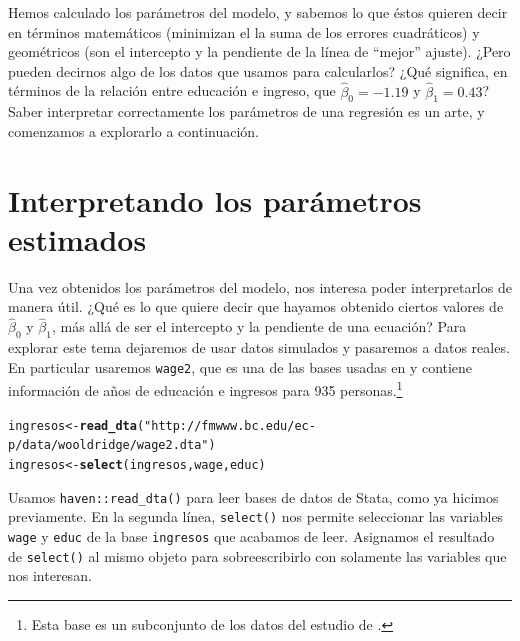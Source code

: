 \documentclass[12pt]{report}\usepackage[]{graphicx}\usepackage[]{color}
\makeatletter
\newcommand{\hlstr}[1]{\textcolor[rgb]{0.192,0.494,0.8}{#1}}%
\newcommand{\hlstd}[1]{\textcolor[rgb]{0.345,0.345,0.345}{#1}}%
\newcommand{\hlkwb}[1]{\textcolor[rgb]{0.69,0.353,0.396}{#1}}%
\newcommand{\hlkwd}[1]{\textcolor[rgb]{0.737,0.353,0.396}{\textbf{#1}}}%
\newenvironment{kframe}{%
 \def\at@end@of@kframe{}%
 \ifinner\ifhmode%
  \def\at@end@of@kframe{\end{minipage}}%
  \begin{minipage}{\columnwidth}%
 \fi\fi%
 \def\FrameCommand##1{\hskip\@totalleftmargin \hskip-\fboxsep
 \colorbox{shadecolor}{##1}\hskip-\fboxsep
     \hskip-\linewidth \hskip-\@totalleftmargin \hskip\columnwidth}%
 \MakeFramed {\advance\hsize-\width
   \@totalleftmargin\z@ \linewidth\hsize
   \@setminipage}}%
 {\par\unskip\endMakeFramed%
 \at@end@of@kframe}
\newenvironment{knitrout}{}{} %
\makeatother
\begin{document}

Hemos calculado los parámetros del modelo, y sabemos lo que éstos quieren decir en términos matemáticos (minimizan el la suma de los errores cuadráticos) y geométricos (son el intercepto y la pendiente de la línea de ``mejor'' ajuste).
¿Pero pueden decirnos algo de los datos que usamos para calcularlos?
¿Qué significa, en términos de la relación entre educación e ingreso, que $\hat \beta_0 = -1.19$ y $\hat \beta_1 = 0.43$?
Saber interpretar correctamente los parámetros de una regresión es un arte, y comenzamos a explorarlo a continuación.


\section{Interpretando los parámetros estimados}

Una vez obtenidos los parámetros del modelo, nos interesa poder interpretarlos de manera útil. ¿Qué es lo que quiere decir que hayamos obtenido ciertos valores de $\hat\beta_0$ y $\hat\beta_1$, más allá de ser el intercepto y la pendiente de una ecuación?
Para explorar este tema dejaremos de usar datos simulados y pasaremos a datos reales.
En particular usaremos \verb|wage2|, que es una de las bases usadas en \textcite{wooldridge_introductory_2016} y contiene información de años de educación e ingresos para 935 personas.\footnote{Esta base es un subconjunto de los datos del estudio de \textcite{blackburn_unobserved_1992}.}

\begin{knitrout}
\color{fgcolor}\begin{kframe}
\begin{alltt}
\hlstd{ingresos} \hlkwb{<-} \hlkwd{read_dta}\hlstd{(}\hlstr{"http://fmwww.bc.edu/ec-p/data/wooldridge/wage2.dta"}\hlstd{)}
\hlstd{ingresos} \hlkwb{<-} \hlkwd{select}\hlstd{(ingresos, wage, educ)}
\end{alltt}
\end{kframe}
\end{knitrout}

\begin{Rbox}
Usamos \verb|haven::read_dta()| para leer bases de datos de Stata, como ya hicimos previamente. En la segunda línea, \verb|select()| nos permite seleccionar las variables \verb|wage| y \verb|educ| de la base \verb|ingresos| que acabamos de leer. Asignamos el resultado de \verb|select()| al mismo objeto para sobreescribirlo con solamente las variables que nos interesan.
\end{Rbox}
\end{document}
